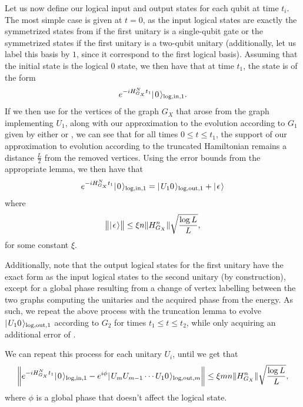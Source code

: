 \documentclass[../thesis-main/thesis-main]{subfiles}
\begin{document}
Let us now define our logical input and output states for each qubit at time $t_i$.  The most simple case is given at $t=0$, as the input logical states are exactly the symmetrized states from  if the first unitary is a single-qubit gate or the symmetrized states  if the first unitary is a two-qubit unitary (additionally, let us label this basis by $1$, since it correspond to the first logical basis).  Assuming that the initial state is the logical 0 state, we then have that at time $t_1$, the state is of the form
\begin{align}
  e^{-i H_{G_X}^N t_1} |\mspace{2mu} 0 \mspace{2mu} \rangle_{\text{log,in},1}.
\end{align}
If we then use  for the vertices of the graph $G_X$ that arose from the graph implementing $U_1$, along with our approximation to the evolution according to $G_1$ given by either  or , we can see that for all times $0\leq t \leq t_1$, the support of our approximation to evolution according to the truncated Hamiltonian remains a distance $\frac{L}{2}$ from the removed vertices.  Using the error bounds from the appropriate lemma, we then have that 
\begin{align}
  e^{-iH_{G_X}^N t_1} |\mspace{2mu} 0 \mspace{2mu} \rangle_{\text{log,in},1} = |\mspace{2mu} U_1 0 \mspace{2mu} \rangle_{\text{log,out},1} + |\mspace{2mu} \epsilon \mspace{2mu} \rangle
\end{align}
where 
\begin{align}
  \big \Vert |\mspace{2mu} \epsilon \mspace{2mu} \rangle \big\Vert \leq \xi n \Vert H_{G_X}^n \Vert \sqrt{\frac{\log L}{L}}, \label{eq:single_gate_error}
\end{align}
for some constant $\xi$.

Additionally, note that the output logical states for the first unitary have the exact form as the input logical states to the second unitary (by construction), except for a global phase resulting from a change of vertex labelling between the two graphs computing the unitaries and the acquired phase from the energy.  As such, we repeat the above process with the truncation lemma to evolve $|\mspace{2mu} U_1 0 \mspace{2mu} \rangle_{\text{log,out},1}$ according to $G_2$ for times $t_1 \leq t \leq t_2$, while only acquiring an additional error of .  

We can repeat this process for each unitary $U_i$, until we get that 
\begin{align}
  \bigg\Vert e^{-i H_{G_X}^N t_1} |\mspace{2mu} 0 \mspace{2mu} \rangle_{\text{log,in},1} - e^{i\phi} |\mspace{2mu} U_m U_{m-1}\cdots U_1 0 \mspace{2mu} \rangle_{\text{log,out},m} \bigg\Vert \leq \xi m n \Vert H_{G_X}^n \Vert \sqrt{\frac{\log L}{L}},
\end{align}
where $\phi$ is a global phase that doesn't affect the logical state.  
\end{document}
